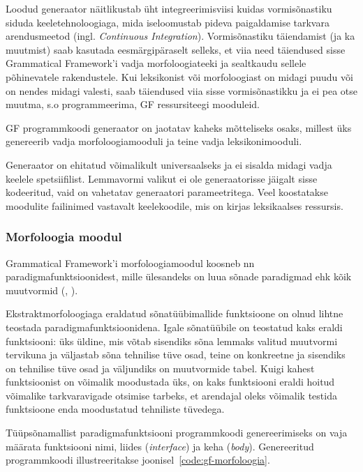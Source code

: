 \documentclass[12pt,a4paper]{article}
\begin{document}
Loodud generaator näitlikustab üht integreerimis\-viisi kuidas vormisõnastiku siduda keele\-tehnoloogiaga, mida iseloomustab pideva paigaldamise tarkvara arendusmeetod (ingl. \textit{Continuous Integration}). Vormisõnastiku täiendamist (ja ka muutmist) saab kasutada eesmärgipäraselt selleks, et viia need täiendused sisse Grammatical Framework'i vadja morfoloogia\-teeki ja sealt\-kaudu sellele põhinevatele rakendustele. Kui leksikonist või morfoloogiast on midagi puudu või on nendes midagi valesti, saab täiendused viia sisse vormi\-sõnastikku ja ei pea otse muutma, s.o programmeerima, GF ressursi\-teegi mooduleid.

GF programmkoodi generaator on jaotatav kaheks mõtteliseks osaks, millest üks genereerib vadja morfoloogia\-mooduli ja teine vadja leksikoni\-mooduli.

Generaator on ehitatud võimalikult universaalseks ja ei sisalda midagi vadja keelele spetsiifilist. Lemmavormi valikut ei ole generaatorisse jäigalt sisse kodeeritud, vaid on vahetatav generaatori parameetritega. Veel koostatakse moodulite faili\-nimed vastavalt keele\-koodile, mis on kirjas leksikaalses ressursis.



\subsubsection{Morfoloogia moodul}
\label{sec:gf-tüüpsõnad}
Grammatical Framework'i morfoloogiamoodul koosneb nn paradigma\-funktsioonidest, mille ülesandeks on luua sõnade paradigmad ehk kõik muutvormid (\cite[248]{ranta_grammatical_2011}, \cite[645]{detrez_smart_2012}).

Ekstrakt\-morfoloogiaga eraldatud sõnatüübi\-mallide funktsioone on olnud lihtne teostada paradigma\-funktsioonidena. Igale sõnatüübile on teostatud kaks eraldi funktsiooni: üks üldine, mis võtab sisendiks sõna lemmaks valitud muutvormi tervikuna ja väljastab sõna tehnilise tüve osad, teine on konkreetne ja sisendiks on tehnilise tüve osad ja väljundiks on muutvormide tabel. Kuigi kahest funktsioonist on võimalik moodustada üks, on kaks funktsiooni eraldi hoitud võimalike tarkvara\-vigade otsimise tarbeks, et arendajal oleks võimalik testida funktsioone enda moodustatud tehniliste tüvedega.

Tüüpsõnamallist paradigmafunktsiooni programmkoodi genereerimiseks on vaja määrata funktsiooni nimi, liides (\textit{interface}) ja keha (\textit{body}). Genereeritud programm\-koodi illustreeritakse joonisel~\ref{code:gf-morfoloogia}. %
\end{document}

